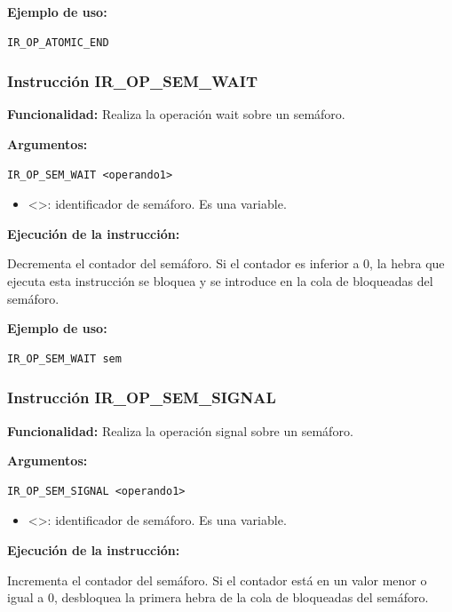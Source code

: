 \noindent
\textbf{Ejemplo de uso:}
\begin{verbatim}
IR_OP_ATOMIC_END
\end{verbatim}

\subsubsection{Instrucción IR\_OP\_SEM\_WAIT}\label{subsubsec:IR_OP_SEM_WAIT}
\noindent
\textbf{Funcionalidad:} Realiza la operación wait sobre un semáforo.

\noindent
\textbf{Argumentos:}
\begin{verbatim}
IR_OP_SEM_WAIT <operando1>
\end{verbatim}
\begin{itemize}
    \item <>: identificador de semáforo. Es una variable.
\end{itemize}

\noindent
\textbf{Ejecución de la instrucción:}
\vspace{0.3cm}

\noindent
Decrementa el contador del semáforo. Si el contador es inferior a 0, la hebra que ejecuta esta instrucción se bloquea y se introduce en la cola de bloqueadas del semáforo.
\vspace{0.3cm}

\noindent
\textbf{Ejemplo de uso:}
\begin{verbatim}
IR_OP_SEM_WAIT sem
\end{verbatim}

\subsubsection{Instrucción IR\_OP\_SEM\_SIGNAL}\label{subsubsec:IR_OP_SEM_SIGNAL}
\noindent
\textbf{Funcionalidad:} Realiza la operación signal sobre un semáforo.

\noindent
\textbf{Argumentos:}
\begin{verbatim}
IR_OP_SEM_SIGNAL <operando1>
\end{verbatim}
\begin{itemize}
    \item <>: identificador de semáforo. Es una variable.
\end{itemize}

\noindent
\textbf{Ejecución de la instrucción:}
\vspace{0.3cm}

\noindent
Incrementa el contador del semáforo. Si el contador está en un valor menor o igual a 0, desbloquea la primera hebra de la cola de bloqueadas del semáforo.
\vspace{0.3cm}

